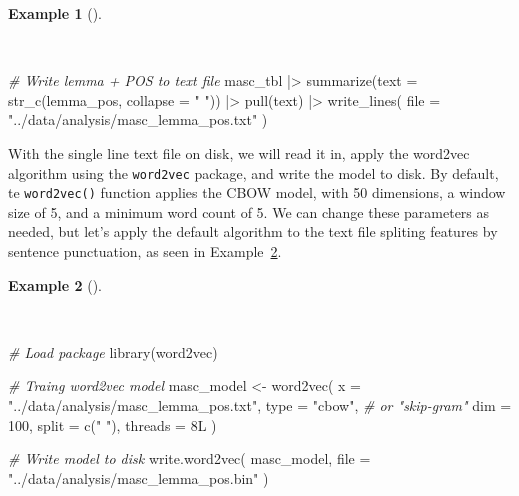 \documentclass[
  letterpaper,
]{latex/krantz}
\newenvironment{Shaded}{\begin{snugshade}}{\end{snugshade}}
\newcommand{\AttributeTok}[1]{\textcolor[rgb]{0.00,0.00,0.00}{#1}}
\newcommand{\CommentTok}[1]{\textcolor[rgb]{0.00,0.00,0.00}{\textit{#1}}}
\newcommand{\DecValTok}[1]{\textcolor[rgb]{0.00,0.00,0.00}{#1}}
\newcommand{\FunctionTok}[1]{\textcolor[rgb]{0.00,0.00,0.00}{#1}}
\newcommand{\NormalTok}[1]{\textcolor[rgb]{0.00,0.00,0.00}{#1}}
\newcommand{\OtherTok}[1]{\textcolor[rgb]{0.00,0.00,0.00}{#1}}
\newcommand{\SpecialCharTok}[1]{\textcolor[rgb]{0.00,0.00,0.00}{#1}}
\newcommand{\StringTok}[1]{\textcolor[rgb]{0.00,0.00,0.00}{#1}}
\theoremstyle{definition}
\newtheorem{example}{Example}[chapter]
\theoremstyle{remark}
\begin{document}
\begin{example}[]\protect\hypertarget{exm-explore-masc-vsm-write-txt}{}\label{exm-explore-masc-vsm-write-txt}

~

\begin{Shaded}
\begin{Highlighting}[]
\CommentTok{\# Write lemma + POS to text file}
\NormalTok{masc\_tbl }\SpecialCharTok{|\textgreater{}}
  \FunctionTok{summarize}\NormalTok{(}\AttributeTok{text =} \FunctionTok{str\_c}\NormalTok{(lemma\_pos, }\AttributeTok{collapse =} \StringTok{" "}\NormalTok{)) }\SpecialCharTok{|\textgreater{}}
  \FunctionTok{pull}\NormalTok{(text) }\SpecialCharTok{|\textgreater{}}
  \FunctionTok{write\_lines}\NormalTok{(}
    \AttributeTok{file =} \StringTok{"../data/analysis/masc\_lemma\_pos.txt"}
\NormalTok{  )}
\end{Highlighting}
\end{Shaded}

\end{example}

With the single line text file on disk, we will read it in, apply the
word2vec algorithm using the \texttt{word2vec} package, and write the
model to disk. By default, te \texttt{word2vec()} function applies the
CBOW model, with 50 dimensions, a window size of 5, and a minimum word
count of 5. We can change these parameters as needed, but let's apply
the default algorithm to the text file spliting features by sentence
punctuation, as seen in
Example~\ref{exm-explore-masc-vsm-word2vec-train}.

\begin{example}[]\protect\hypertarget{exm-explore-masc-vsm-word2vec-train}{}\label{exm-explore-masc-vsm-word2vec-train}

~

\begin{Shaded}
\begin{Highlighting}[]
\CommentTok{\# Load package}
\FunctionTok{library}\NormalTok{(word2vec)}

\CommentTok{\# Traing word2vec model}
\NormalTok{masc\_model }\OtherTok{\textless{}{-}}
  \FunctionTok{word2vec}\NormalTok{(}
    \AttributeTok{x =} \StringTok{"../data/analysis/masc\_lemma\_pos.txt"}\NormalTok{,}
    \AttributeTok{type =} \StringTok{"cbow"}\NormalTok{, }\CommentTok{\# or "skip{-}gram"}
    \AttributeTok{dim =} \DecValTok{100}\NormalTok{,}
    \AttributeTok{split =} \FunctionTok{c}\NormalTok{(}\StringTok{" "}\NormalTok{),}
    \AttributeTok{threads =} \DecValTok{8}\NormalTok{L}
\NormalTok{  )}

\CommentTok{\# Write model to disk}
\FunctionTok{write.word2vec}\NormalTok{(}
\NormalTok{  masc\_model,}
  \AttributeTok{file =} \StringTok{"../data/analysis/masc\_lemma\_pos.bin"}
\NormalTok{)}
\end{Highlighting}
\end{Shaded}

\end{example}
\end{document}
